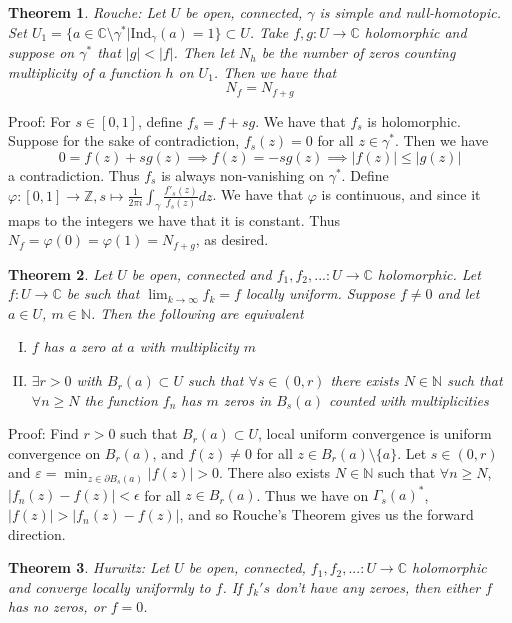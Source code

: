 \documentclass[11pt]{article}
\theoremstyle{plain}
\newtheorem{theorem}{Theorem}[section]
\theoremstyle{definition}
\newcommand{\C}{\mathbb{C}}
\newcommand{\Ind}{\text{Ind}}
\newcommand{\Z}{\mathbb{Z}}
\newcommand{\N}{\mathbb{N}}
\begin{document}
\begin{theorem}
Rouche: Let $U$ be open, connected, $\gamma$ is simple and null-homotopic. Set $U_1 = \{ a \in \C \setminus \gamma^* | \Ind_\gamma(a) = 1\} \subset U$. Take $f, g: U \to \C$ holomorphic and suppose on $\gamma^*$ that $|g| < |f|$. Then let $N_h$ be the number of zeros counting multiplicity of a function $h$ on $U_1$. Then we have that 
$$N_f = N_{f+g} $$
\end{theorem}

Proof: For $s \in [0,1]$, define $f_s = f + sg$. We have that $f_s$ is holomorphic. Suppose for the sake of contradiction, $f_s(z) = 0$ for all $z \in \gamma^*$. Then we have 
$$ 0 = f(z) + sg(z) \implies f(z) = -sg(z) \implies |f(z)| \leq |g(z)| $$
a contradiction. Thus $f_s$ is always non-vanishing on $\gamma^*$. Define $\varphi:[0,1] \to \Z, s\mapsto \frac{1}{2\pi i} \int_\gamma \frac{f'_s(z)}{f_s(z)} dz$. We have that $\varphi$ is continuous, and since it maps to the integers we have that it is constant. Thus $N_f = \varphi(0) = \varphi(1) = N_{f+g}$, as desired. 

\begin{theorem}
Let $U$ be open, connected and $f_1, f_2, ...:U\to \C$ holomorphic. Let $f:U\to\C$ be such that $\lim_{k\to\infty}f_k = f$ locally uniform. Suppose $f \neq 0$ and let $a\in U$, $m \in \N$. Then the following are equivalent
\begin{enumerate}[(I)]
\item $f$ has a zero at $a$ with multiplicity $m$
\item $\exists r > 0$ with $B_r(a) \subset U$ such that $\forall s \in (0, r)$ there exists $N \in \N$ such that $\forall n \geq N$ the function $f_n$ has $m$ zeros in $B_s(a)$ counted with multiplicities 
\end{enumerate}
\end{theorem}

Proof: Find $r>0$ such that $B_r(a) \subset U$, local uniform convergence is uniform convergence on $B_r(a)$, and $f(z) \neq 0$ for all $z \in B_r(a) \setminus \{ a\}$. Let $s \in (0, r)$ and $\varepsilon = \min_{z \in \partial B_s(a)} |f(z)| > 0$. There also exists $N \in \N$ such that $\forall n \geq N$, $|f_n(z) - f(z)| < \epsilon$ for all $z \in B_r(a)$. Thus we have on $\Gamma_s(a)^*$, $|f(z)| > |f_n(z) - f(z)|$, and so Rouche's Theorem gives us the forward direction.

\begin{theorem}
Hurwitz: Let $U$ be open, connected, $f_1, f_2, ...: U \to \C$ holomorphic and converge locally uniformly to $f$. If $f_k's$ don't have any zeroes, then either $f$ has no zeros, or $f = 0$. 
\end{theorem}
\end{document}
